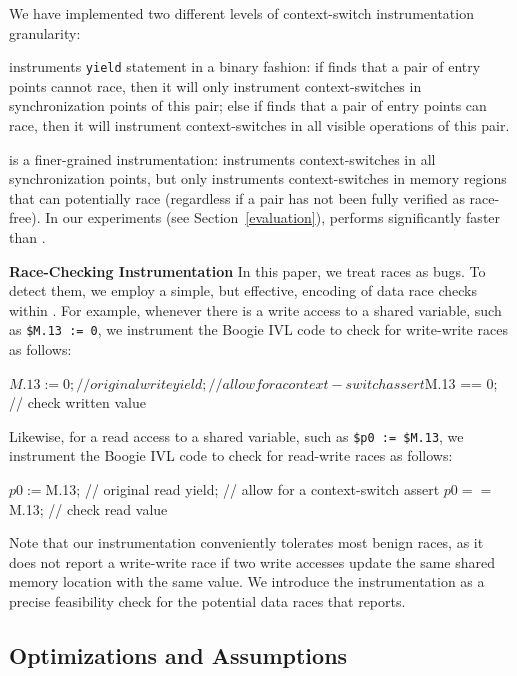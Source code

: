 We have implemented two different levels of context-switch instrumentation granularity:

\yieldcoarse instruments \texttt{yield} statement in a binary fashion: if \whoop
finds that a pair of entry points cannot race, then it will only instrument
context-switches in synchronization points of this pair; else if \whoop finds
that a pair of entry points can race, then it will instrument context-switches
in all visible operations of this pair.

\yieldmr is a finer-grained instrumentation: \whoop instruments context-switches
in all synchronization points, but only instruments context-switches in memory
regions that can potentially race (regardless if a pair has not been fully
verified as race-free). In our experiments (see Section~\ref{evaluation}),
\yieldmr performs significantly faster than \yieldcoarse.

\noindent
\textbf{Race-Checking Instrumentation}\xspace\xspace In this paper, we treat races as bugs. To detect them, we employ a simple, but effective, encoding of data race checks within \corral.
For example, whenever there is a write access to a shared variable, such as
\texttt{\$M.13 := 0}, we instrument the Boogie IVL code to check for write-write
races as follows:
%
\begin{boogie}
$M.13 := 0;        // original write
yield;             // allow for a context-switch
assert $M.13 == 0; // check written value
\end{boogie}
%
Likewise, for a read access to a shared variable, such as \texttt{\$p0 :=
\$M.13}, we instrument the Boogie IVL code to check for read-write races as
follows:
%
\begin{boogie}
$p0 := $M.13;        // original read
yield;               // allow for a context-switch
assert $p0 == $M.13; // check read value
\end{boogie}

Note that our instrumentation conveniently tolerates most benign races, as it does not report a write-write race if two write accesses update the same shared memory location with the same value.  We introduce the instrumentation as a precise feasibility check for the potential data races that \whoop reports.

\subsection{Optimizations and Assumptions}
\label{whoop:optimizations}

